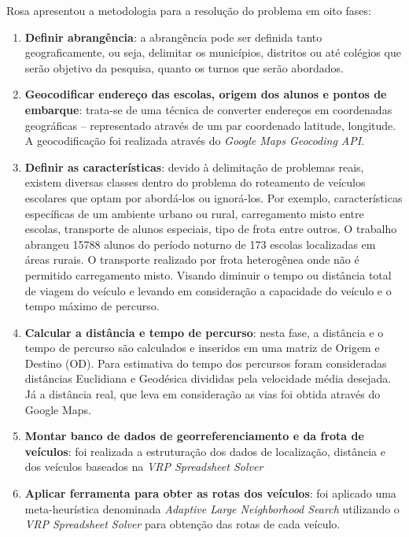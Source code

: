 Rosa \citeyear{maxwell} apresentou a metodologia para a resolução do problema em oito fases:
\begin{enumerate}
    \item \textbf{Definir abrangência}: a abrangência pode ser definida tanto geograficamente, ou seja, delimitar os municípios, distritos ou até colégios que serão objetivo da pesquisa, quanto os turnos que serão abordados.
    
    \item \textbf{Geocodificar endereço das escolas, origem dos alunos e pontos de embarque}: trata-se de uma técnica de converter endereços em coordenadas geográficas -- representado através de um par coordenado latitude, longitude. A geocodificação foi realizada através do \emph{Google Maps Geocoding API}.
    
    \item \textbf{Definir as características}: devido à delimitação de problemas reais, existem diversas classes dentro do problema do roteamento de veículos escolares que optam por abordá-los ou ignorá-los. Por exemplo, características específicas de um ambiente urbano ou rural, carregamento misto entre escolas, transporte de alunos especiais, tipo de frota entre outros. O trabalho abrangeu 15788 alunos do período noturno de 173 escolas localizadas em áreas rurais. O transporte realizado por frota heterogênea onde não é permitido carregamento misto. Visando diminuir o tempo ou distância total de viagem do veículo e levando em consideração a capacidade do veículo e o tempo máximo de percurso.
    
    \item \textbf{Calcular a distância e tempo de percurso}: nesta fase, a distância e o tempo de percurso são calculados e inseridos em uma matriz de Origem e Destino (OD). Para estimativa do tempo dos percursos foram consideradas distâncias Euclidiana e Geodésica divididas pela velocidade média desejada. Já a distância real, que leva em consideração as vias foi obtida através do Google Maps.
    
    \item \textbf{Montar banco de dados de georreferenciamento e da frota de veículos}: foi realizada a estruturação dos dados de localização, distância e dos veículos baseados na \emph{VRP Spreadsheet Solver}
    
    \item \textbf{Aplicar ferramenta para obter as rotas dos veículos}: foi aplicado uma meta-heurística denominada \emph{Adaptive Large Neighborhood Search} utilizando o \emph{VRP Spreadsheet Solver} para obtenção das rotas de cada veículo.    
    

\end{enumerate}
